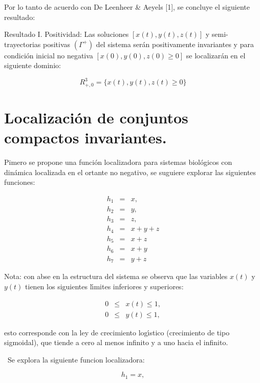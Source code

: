 \documentclass[letterpaper,11pt]{article}
\begin{document}
Por lo tanto de acuerdo con De Leenheer \& Aeyels [1], se concluye el
siguiente resultado:

\bigskip

Resultado I. Positividad: Las soluciones $\left[ x\left( t\right) ,y\left(
t\right) ,z\left( t\right) \right] $ y semi-trayectorias positivas $\left(
\Gamma ^{+}\right) $ del sistema ser\'{a}n positivamente invariantes y para
condici\'{o}n inicial no negativa $\left[ x\left( 0\right) ,y\left( 0\right)
,z\left( 0\right) \geq 0\right] $ se localizar\'{a}n en el siguiente dominio:

\begin{equation*}
R_{+,0}^{3}=\{x\left( t\right) ,y\left( t\right) ,z\left( t\right) \geq 0\}
\end{equation*}

\bigskip

\section{Localizaci\'{o}n de conjuntos compactos invariantes.}

Pimero se propone una funci\'{o}n localizadora para sistemas biol\'{o}gicos
con din\'{a}mica localizada en el ortante no negativo, se suguiere explorar
las siguientes funciones:

\begin{eqnarray*}
h_{1} &=&x, \\
h_{2} &=&y, \\
h_{3} &=&z, \\
h_{4} &=&x+y+z \\
h_{5} &=&x+z \\
h_{6} &=&x+y \\
h_{7} &=&y+z
\end{eqnarray*}

Nota: con abse en la estructura del sistema se observa que las variables $%
x(t)$ y $y(t)$ tienen los siguientes l\'{\i}mites inferiores y superiores:

\begin{eqnarray*}
0 &\leq &x(t)\leq 1, \\
0 &\leq &y(t)\leq 1,
\end{eqnarray*}

esto corresponde con la ley de crecimiento log\'{\i}stico (crecimiento de
tipo sigmoidal), que tiende a cero al menos infinito y a uno hacia el
infinito.

\ Se explora la siguiente funcion localizadora:

\begin{equation*}
h_{1}=x,
\end{equation*}
\end{document}
